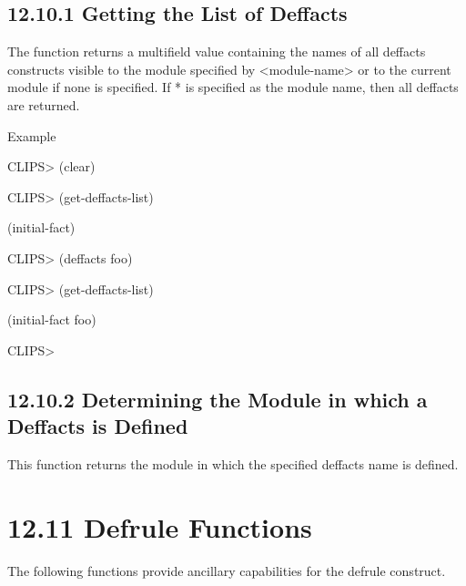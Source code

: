 \documentclass[letterpaper,10pt,english]{sphinxmanual}
\begin{document}
\subsection{12.10.1 Getting the List of Deffacts}
\label{\detokenize{actions:getting-the-list-of-deffacts}}
The function  returns a multifield value containing
the names of all deffacts constructs visible to the module specified by
\textless{}module-name\textgreater{} or to the current module if none is specified. If * is
specified as the module name, then all deffacts are returned.


\begin{sphinxVerbatim}[commandchars=\\\{\}]
 \PYG{p}{[}\PYG{p}{]}
\end{sphinxVerbatim}

Example

CLIPS\textgreater{} (clear)

CLIPS\textgreater{} (get-deffacts-list)

(initial-fact)

CLIPS\textgreater{} (deffacts foo)

CLIPS\textgreater{} (get-deffacts-list)

(initial-fact foo)

CLIPS\textgreater{}


\subsection{12.10.2 Determining the Module in which a Deffacts is Defined}
\label{\detokenize{actions:determining-the-module-in-which-a-deffacts-is-defined}}
This function returns the module in which the specified deffacts name is
defined.


\begin{sphinxVerbatim}[commandchars=\\\{\}]
 
\end{sphinxVerbatim}


\section{12.11 Defrule Functions}
\label{\detokenize{actions:defrule-functions}}
The following functions provide ancillary capabilities for the defrule
construct.
\end{document}
